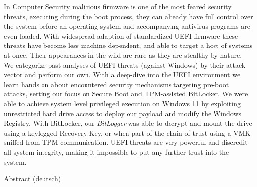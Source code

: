 

\label{sec:abstract}

In Computer Security malicious firmware is one of the most feared security threats, executing during the boot process, they can already have full control over the system before an operating system and accompanying antivirus programs are even loaded.
With widespread adaption of standardized \acs{UEFI} firmware these threats have become less machine dependent, and able to target a host of systems at once.
Their appearances in the wild are rare as they are stealthy by nature. We categorize past analyses of UEFI threats (against Windows) by their attack vector and perform our own.
With a deep-dive into the UEFI environment we learn hands on about encountered security mechanisms targeting pre-boot attacks, setting our focus on Secure Boot and TPM-assisted BitLocker.
We were able to achieve system level privileged execution on Windows 11 by exploiting unrestricted hard drive access to deploy our payload and modify the Windows Registry. With BitLocker, our \emph{BitLogger} was able to decrypt and mount the drive using a keylogged Recovery Key, or when part of the chain of trust using a VMK sniffed from TPM communication.
UEFI threats are very powerful and discredit all system integrity, making it impossible to put any further trust into the system.

\vspace*{20mm}

{Abstract (deutsch)}
\label{sec:abstract-diff}

\blindtext
